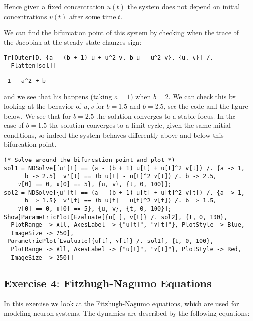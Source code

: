 \documentclass[11pt,a4paper,onecolumn]{article}
\begin{document}
\begin{figure}[H]
  \centering
\end{figure}

Hence given a fixed concentration $u(t)$ the system does not depend on initial concentrations $v(t)$ after some time $t$.

We can find the bifurcation point of this system by checking when the trace of the Jacobian at the steady state changes sign:

\begin{lstlisting}[mathescape]
Tr[Outer[D, {a - (b + 1) u + u^2 v, b u - u^2 v}, {u, v}] /. 
  Flatten[sol]]
\end{lstlisting}
 
\begin{lstlisting}[mathescape]
-1 - a^2 + b
\end{lstlisting}

and we see that his happens (taking $a = 1$) when $b = 2$. We can check this by looking at the behavior of $u,v$ for $b = 1.5$ and $b = 2.5$, see the code and the figure below. We see that for $b = 2.5$ the solution converges to a stable focus. In the case of $b = 1.5$ the solution converges to a limit cycle, given the same initial conditions, so indeed the system behaves differently above and below this bifurcation point.

\begin{lstlisting}[mathescape]
(* Solve around the bifurcation point and plot *)
sol1 = NDSolve[{u'[t] == (a - (b + 1) u[t] + u[t]^2 v[t]) /. {a -> 1, 
      b -> 2.5}, v'[t] == (b u[t] - u[t]^2 v[t]) /. b -> 2.5, 
    v[0] == 0, u[0] == 5}, {u, v}, {t, 0, 100}];
sol2 = NDSolve[{u'[t] == (a - (b + 1) u[t] + u[t]^2 v[t]) /. {a -> 1, 
      b -> 1.5}, v'[t] == (b u[t] - u[t]^2 v[t]) /. b -> 1.5, 
    v[0] == 0, u[0] == 5}, {u, v}, {t, 0, 100}];
Show[ParametricPlot[Evaluate[{u[t], v[t]} /. sol2], {t, 0, 100}, 
  PlotRange -> All, AxesLabel -> {"u[t]", "v[t]"}, PlotStyle -> Blue, 
  ImageSize -> 250], 
 ParametricPlot[Evaluate[{u[t], v[t]} /. sol1], {t, 0, 100}, 
  PlotRange -> All, AxesLabel -> {"u[t]", "v[t]"}, PlotStyle -> Red, 
  ImageSize -> 250]]
\end{lstlisting}

\begin{figure}[H]
  \centering
\end{figure}

\subsection{Exercise 4: Fitzhugh-Nagumo Equations}
In this exercise we look at the Fitzhugh-Nagumo equations, which are used for modeling neuron systems. The dynamics are described by the following equations:
\end{document}
